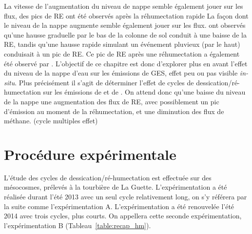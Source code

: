 La vitesse de l'augmentation du niveau de nappe semble également jouer sur les flux, des pics de RE ont été observés après la réhumectation rapide 
La façon dont le niveau de la nappe augmente semble également jouer sur les flux.
\citet{strack2009} ont observés qu'une hausse graduelle par le bas de la colonne de sol conduit à une baisse de la RE, tandis qu'une hausse rapide simulant un événement pluvieux (par le haut) conduisait à un pic de RE.
Ce pic de RE après une réhumectation a également été observé par \citet{mcneil2003}.
L'objectif de ce chapitre est donc d'explorer plus en avant l'effet du niveau de la nappe d'eau sur les émissions de GES, effet peu ou pas visible \textit{in-situ}.
Plus précisément il s'agit de déterminer l'effet de cycles de dessication/ré-humectation sur les émissions de \coo et de \chh. 
On attend donc qu'une baisse du niveau de la nappe une augmentation des flux de RE, avec possiblement un pic d'émission au moment de la réhumectation, et une diminution des flux de méthane.
(\plop cycle multiples effet)

\section{Procédure expérimentale}

L'étude des cycles de dessication/ré-humectation est effectuée sur des mésocosmes, prélevés à la tourbière de La Guette.
L'expérimentation a été réalisée durant l'été 2013 avec un seul cycle relativement long, on s'y référera par la suite comme l'expérimentation A.
L'expérimentation a été renouvelée l'été 2014 avec trois cycles, plus courts.
On appellera cette seconde expérimentation, l'expérimentation B (Tableau~\ref{table:recap_hm}).

